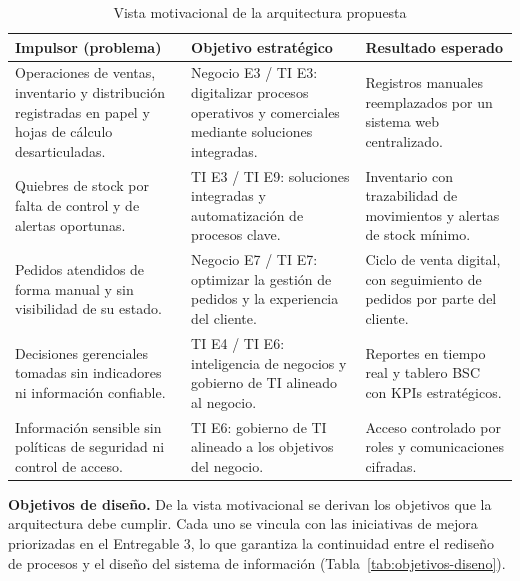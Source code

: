 \begin{table}[H]
\centering
\caption{Vista motivacional de la arquitectura propuesta}
\label{tab:vista-motivacional}
\small
\renewcommand{\arraystretch}{1.3}
\begin{tabularx}{\textwidth}{|X|>{\raggedright\arraybackslash}p{3.6cm}|X|}
\hline
\textbf{Impulsor (problema)} & \textbf{Objetivo estratégico} & \textbf{Resultado esperado} \\
\hline
Operaciones de ventas, inventario y distribución registradas en papel y hojas de cálculo desarticuladas. & Negocio E3 / TI E3: digitalizar procesos operativos y comerciales mediante soluciones integradas. & Registros manuales reemplazados por un sistema web centralizado. \\
\hline
Quiebres de stock por falta de control y de alertas oportunas. & TI E3 / TI E9: soluciones integradas y automatización de procesos clave. & Inventario con trazabilidad de movimientos y alertas de stock mínimo. \\
\hline
Pedidos atendidos de forma manual y sin visibilidad de su estado. & Negocio E7 / TI E7: optimizar la gestión de pedidos y la experiencia del cliente. & Ciclo de venta digital, con seguimiento de pedidos por parte del cliente. \\
\hline
Decisiones gerenciales tomadas sin indicadores ni información confiable. & TI E4 / TI E6: inteligencia de negocios y gobierno de TI alineado al negocio. & Reportes en tiempo real y tablero BSC con KPIs estratégicos. \\
\hline
Información sensible sin políticas de seguridad ni control de acceso. & TI E6: gobierno de TI alineado a los objetivos del negocio. & Acceso controlado por roles y comunicaciones cifradas. \\
\hline
\end{tabularx}
\end{table}

\textbf{Objetivos de diseño.} De la vista motivacional se derivan los objetivos que la arquitectura debe cumplir. Cada uno se vincula con las iniciativas de mejora priorizadas en el Entregable 3, lo que garantiza la continuidad entre el rediseño de procesos y el diseño del sistema de información (Tabla~\ref{tab:objetivos-diseno}).

